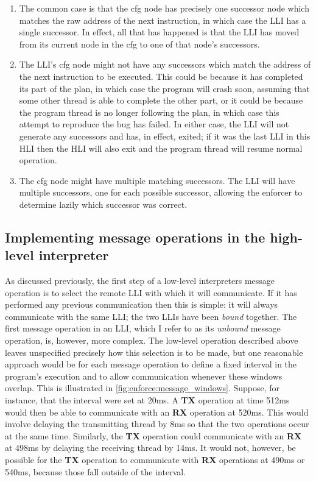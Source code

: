 \begin{enumerate}
\item The common case is that the \gls{cfg} node has precisely one
  successor node which matches the raw address of the next
  instruction, in which case the LLI has a single successor.  In
  effect, all that has happened is that the LLI has moved from its
  current node in the \gls{cfg} to one of that node's successors.

\item The LLI's \gls{cfg} node might not have any successors which
  match the address of the next instruction to be executed.  This
  could be because it has completed its part of the plan, in which
  case the program will crash soon, assuming that some other thread is
  able to complete the other part, or it could be because the program
  thread is no longer following the plan, in which case this attempt
  to reproduce the bug has failed.  In either case, the LLI will not
  generate any successors and has, in effect, exited; if it was the
  last LLI in this HLI then the HLI will also exit and the program
  thread will resume normal operation.

\item The \gls{cfg} node might have multiple matching successors.  The LLI
  will have multiple successors, one for each possible successor,
  allowing the enforcer to determine lazily which successor was
  correct.
\end{enumerate}

\subsection{Implementing message operations in the high-level interpreter}
\label{sect:enforce:hli_messages}

As discussed previously, the first step of a low-level interpreters
message operation is to select the remote LLI with which it will
communicate.  If it has performed any previous communication then this
is simple: it will always communicate with the same LLI; the two LLIs
have been \emph{bound} together.  The first message operation in an
LLI, which I refer to as its \emph{unbound} message operation, is,
however, more complex.  The low-level operation described above leaves
unspecified precisely how this selection is to be made, but one
reasonable approach would be for each message operation to define a
fixed interval in the program's execution and to allow communication
whenever these windows overlap.  This is illustrated in
\autoref{fig:enforce:message_windows}.  Suppose, for instance, that
the interval were set at 20ms.  A \textbf{TX} operation at time 512ms
would then be able to communicate with an \textbf{RX} operation at
520ms.  This would involve delaying the transmitting thread by 8ms so
that the two operations occur at the same time.  Similarly, the
\textbf{TX} operation could communicate with an \textbf{RX} at 498ms
by delaying the receiving thread by 14ms.  It would not, however, be
possible for the \textbf{TX} operation to communicate with \textbf{RX}
operations at 490ms or 540ms, because those fall outside of the
interval.

